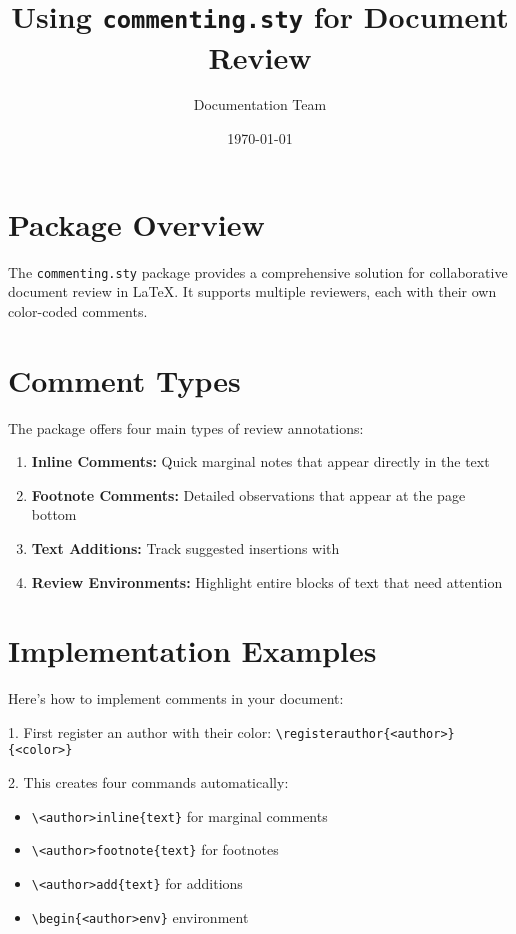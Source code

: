\documentclass{article}
\title{Using \texttt{commenting.sty} for Document Review}
\author{Documentation Team}
\date{\today}
\begin{document}
\maketitle

\section{Package Overview}
The \texttt{commenting.sty} package provides a comprehensive solution for collaborative document 
review in LaTeX. It supports multiple reviewers, each 
with their own color-coded comments.

\section{Comment Types}
The package offers four main types of review annotations:

\begin{enumerate}
    \item \textbf{Inline Comments:} Quick marginal notes that appear directly in 
    the text
    
    \item \textbf{Footnote Comments:} Detailed observations that appear at the page 
    bottom
    
    \item \textbf{Text Additions:} Track suggested insertions with 
    
    \item \textbf{Review Environments:} Highlight entire blocks of text that need attention
\end{enumerate}

\section{Implementation Examples}
\begin{aliceenv}
Here's how to implement comments in your document:

1. First register an author with their color:
   \verb|\registerauthor{<author>}{<color>}|

2. This creates four commands automatically:
   \begin{itemize}
       \item \verb|\<author>|\verb|inline{text}| for marginal comments
       \item \verb|\<author>|\verb|footnote{text}| for footnotes
       \item \verb|\<author>|\verb|add{text}| for additions
       \item \verb|\begin{<author>|\verb|env}| environment
   \end{itemize}
\end{aliceenv}
\end{document}
